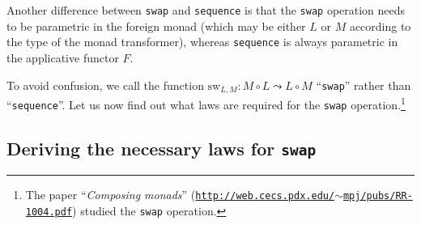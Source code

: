 Another difference between \lstinline!swap! and \lstinline!sequence!
is that the \texttt{}\lstinline!swap! operation needs to be parametric
in the foreign monad (which may be either $L$ or $M$ according to
the type of the monad transformer), whereas \lstinline!sequence!
is always parametric in the applicative functor $F$. %

To avoid confusion, we call the function $\text{sw}_{L,M}:M\circ L\leadsto L\circ M$
\textsf{``}\lstinline!swap!\textsf{''} rather than \textsf{``}\lstinline!sequence!\textsf{''}. Let
us now find out what laws are required for the \texttt{}\lstinline!swap!
operation.\footnote{The paper \textsf{``}\emph{Composing monads}\textsf{''} (\texttt{\href{http://web.cecs.pdx.edu/~mpj/pubs/RR-1004.pdf}{http://web.cecs.pdx.edu/$\sim$mpj/pubs/RR-1004.pdf}})
studied the \lstinline!swap! operation.}

\subsection{Deriving the necessary laws\label{subsec:Deriving-the-necessary-laws-for-swap}
for \texttt{swap}}

